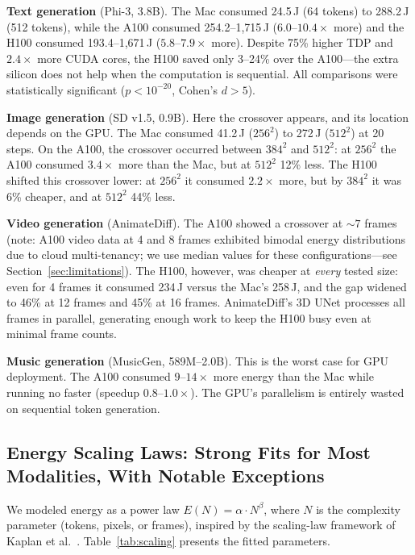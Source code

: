 \documentclass[acmlarge,manuscript,screen,review]{acmart}
\begin{document}
\textbf{Text generation} (Phi-3, 3.8B). The Mac consumed 24.5\,J (64 tokens) to 288.2\,J (512 tokens), while the A100 consumed 254.2--1,715\,J ($6.0$--$10.4\times$ more) and the H100 consumed 193.4--1,671\,J ($5.8$--$7.9\times$ more). Despite 75\% higher TDP and $2.4\times$ more CUDA cores, the H100 saved only 3--24\% over the A100---the extra silicon does not help when the computation is sequential. All comparisons were statistically significant ($p < 10^{-20}$, Cohen's $d > 5$).

\textbf{Image generation} (SD v1.5, 0.9B). Here the crossover appears, and its location depends on the GPU. The Mac consumed 41.2\,J ($256^2$) to 272\,J ($512^2$) at 20 steps. On the A100, the crossover occurred between $384^2$ and $512^2$: at $256^2$ the A100 consumed $3.4\times$ more than the Mac, but at $512^2$ 12\% less. The H100 shifted this crossover lower: at $256^2$ it consumed $2.2\times$ more, but by $384^2$ it was 6\% cheaper, and at $512^2$ 44\% less.

\textbf{Video generation} (AnimateDiff). The A100 showed a crossover at ${\sim}7$ frames (note: A100 video data at 4 and 8 frames exhibited bimodal energy distributions due to cloud multi-tenancy; we use median values for these configurations---see Section~\ref{sec:limitations}). The H100, however, was cheaper at \emph{every} tested size: even for 4 frames it consumed 234\,J versus the Mac's 258\,J, and the gap widened to 46\% at 12 frames and 45\% at 16 frames. AnimateDiff's 3D UNet processes all frames in parallel, generating enough work to keep the H100 busy even at minimal frame counts.

\textbf{Music generation} (MusicGen, 589M--2.0B). This is the worst case for GPU deployment. The A100 consumed $9$--$14\times$ more energy than the Mac while running no faster (speedup $0.8$--$1.0\times$). The GPU's parallelism is entirely wasted on sequential token generation.

\subsection{Energy Scaling Laws: Strong Fits for Most Modalities, With Notable Exceptions}
\label{sec:scaling}

We modeled energy as a power law $E(N) = \alpha \cdot N^\beta$, where $N$ is the complexity parameter (tokens, pixels, or frames), inspired by the scaling-law framework of Kaplan et al.~\cite{kaplan2020scaling}. Table~\ref{tab:scaling} presents the fitted parameters.
\end{document}
